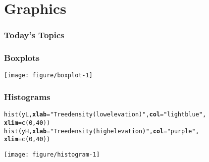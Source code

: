 \documentclass[color=usenames,dvipsnames]{beamer}\usepackage[]{graphicx}\usepackage[]{color}
\makeatletter
\newcommand{\hlnum}[1]{\textcolor[rgb]{0.69,0.494,0}{#1}}%
\newcommand{\hlstr}[1]{\textcolor[rgb]{0.749,0.012,0.012}{#1}}%
\newcommand{\hlstd}[1]{\textcolor[rgb]{0,0,0}{#1}}%
\newcommand{\hlkwc}[1]{\textcolor[rgb]{0,0,0}{\textbf{#1}}}%
\newcommand{\hlkwd}[1]{\textcolor[rgb]{0.004,0.004,0.506}{#1}}%
\newenvironment{kframe}{%
 \def\at@end@of@kframe{}%
 \ifinner\ifhmode%
  \def\at@end@of@kframe{\end{minipage}}%
  \begin{minipage}{\columnwidth}%
 \fi\fi%
 \def\FrameCommand##1{\hskip\@totalleftmargin \hskip-\fboxsep
 \colorbox{shadecolor}{##1}\hskip-\fboxsep
     \hskip-\linewidth \hskip-\@totalleftmargin \hskip\columnwidth}%
 \MakeFramed {\advance\hsize-\width
   \@totalleftmargin\z@ \linewidth\hsize
   \@setminipage}}%
 {\par\unskip\endMakeFramed%
 \at@end@of@kframe}
\newenvironment{knitrout}{}{} %
\makeatother
\begin{document}
\section{Graphics}



\begin{frame}[plain]
  \frametitle{Today's Topics}
  \Large
\end{frame}






\begin{frame}[fragile]
  \frametitle{Boxplots}
  \begin{center}
  \footnotesize

\vspace{-3mm}
\texttt{[image: figure/boxplot-1]}
  \end{center}
\end{frame}





\begin{frame}[fragile]
  \frametitle{Histograms}
  \footnotesize

\begin{knitrout}
\color{fgcolor}\begin{kframe}
\begin{alltt}
\hlkwd{hist}\hlstd{(yL,} \hlkwc{xlab}\hlstd{=}\hlstr{"Tree density (low elevation)"}\hlstd{,} \hlkwc{col}\hlstd{=}\hlstr{"lightblue"}\hlstd{,}
     \hlkwc{xlim}\hlstd{=}\hlkwd{c}\hlstd{(}\hlnum{0}\hlstd{,} \hlnum{40}\hlstd{))}
\hlkwd{hist}\hlstd{(yH,} \hlkwc{xlab}\hlstd{=}\hlstr{"Tree density (high elevation)"}\hlstd{,} \hlkwc{col}\hlstd{=}\hlstr{"purple"}\hlstd{,}
     \hlkwc{xlim}\hlstd{=}\hlkwd{c}\hlstd{(}\hlnum{0}\hlstd{,} \hlnum{40}\hlstd{))}
\end{alltt}
\end{kframe}
\end{knitrout}
\texttt{[image: figure/histogram-1]}
\end{frame}





\end{document}
